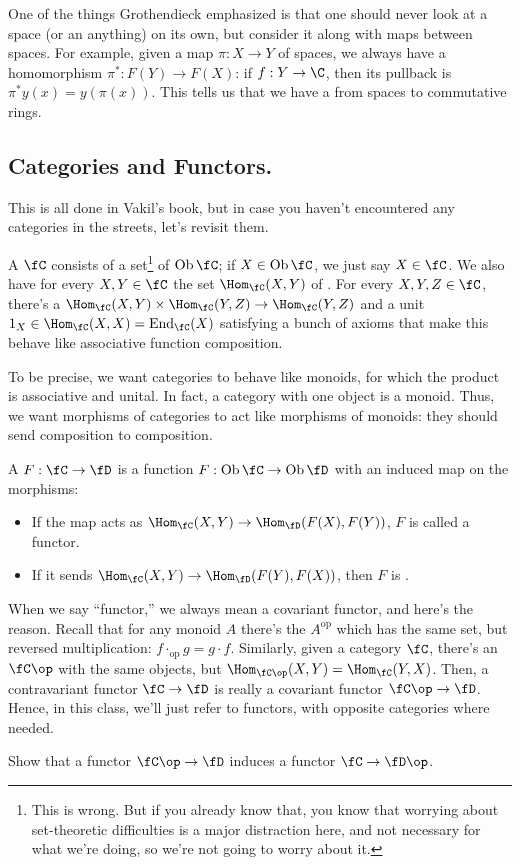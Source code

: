 One of the things Grothendieck emphasized is that one should never look at a space (or an anything) on its own, but
consider it along with maps between spaces. For example, given a map \(\pi:X\to Y\) of spaces, we always have a
 homomorphism \(\pi^*: F(Y)\to F(X)\): if \(f:Y\to\C\), then its pullback is \(\pi^*y(x) =
y(\pi(x))\). This tells us that we have a  from spaces to commutative rings.
\subsection*{Categories and Functors.}
This is all done in Vakil's book, but in case you haven't encountered any categories in the streets, let's revisit
them.
\begin{defn}
A  \(\fC\) consists of a set\footnote{This is wrong. But if you already know that, you know that
worrying about set-theoretic difficulties is a major distraction here, and not necessary for what we're doing, so
we're not going to worry about it.} of  \(\operatorname{Ob}\fC\); if \(X\in\operatorname{Ob}\fC\), we
just say \(X\in\fC\). We also have for every \(X,Y\in\fC\) the set \(\Hom_\fC(X,Y)\) of . For every
\(X,Y,Z\in\fC\), there's a  \(\Hom_\fC(X,Y)\times\Hom_\fC(Y,Z)\to\Hom_\fC(Y,Z)\) and a unit
\(1_X\in\Hom_\fC(X,X) = \operatorname{End}_\fC(X)\) satisfying a bunch of axioms that make this behave like
associative function composition.
\end{defn}
To be precise, we want categories to behave like monoids, for which the product is associative and unital. In fact,
a category with one object is a monoid. Thus, we want morphisms of categories to act like morphisms of monoids:
they should send composition to composition.
\begin{defn}
A  \(F:\fC\to\fD\) is a function \(F:\operatorname{Ob}\fC\to\operatorname{Ob}\fD\) with an
induced map on the morphisms:
\begin{itemize}
	\item If the map acts as \(\Hom_\fC(X,Y)\to\Hom_{\fD}(F(X),F(Y))\), \(F\) is called a 
	functor.
	\item If it sends \(\Hom_\fC(X,Y)\to\Hom_{\fD}(F(Y),F(X))\), then \(F\) is .
\end{itemize}
\end{defn}
When we say ``functor,'' we always mean a covariant functor, and here's the reason. Recall that for any monoid
\(A\) there's the  \(A^{\text{op}}\) which has the same set, but reversed multiplication:
\(f\cdot_{\text{op}} g = g\cdot f\). Similarly, given a category \(\fC\), there's an 
\(\fC\op\) with the same objects, but \(\Hom_{\fC\op}(X,Y) = \Hom_{\fC}(Y,X)\). Then, a contravariant functor
\(\fC\to\fD\) is really a covariant functor \(\fC\op\to\fD\). Hence, in this class, we'll just refer to
functors, with opposite categories where needed.
\begin{ex}
Show that a functor \(\fC\op\to\fD\) induces a functor \(\fC\to\fD\op\).
\end{ex}

